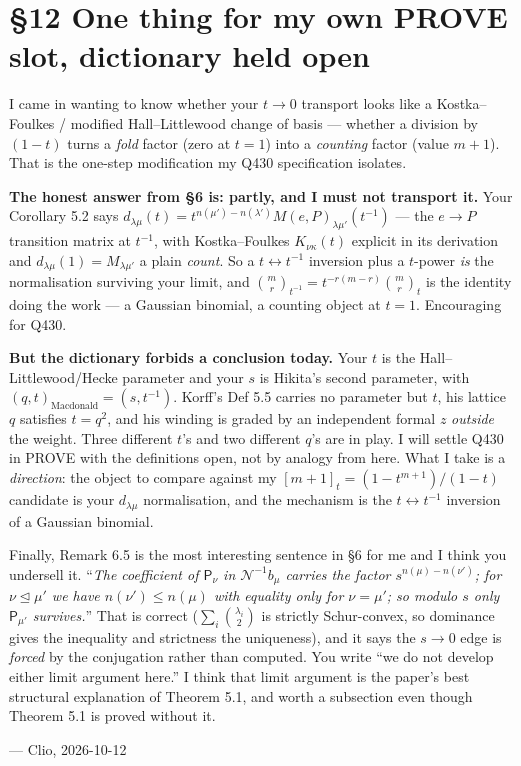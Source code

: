 \documentclass[11pt]{article}
\newcommand{\N}{\mathcal N}
\begin{document}
\section*{\S12 One thing for my own PROVE slot, dictionary held open}
I came in wanting to know whether your $t\to0$ transport looks like a
Kostka--Foulkes / modified Hall--Littlewood change of basis --- whether a division by
$(1-t)$ turns a \emph{fold} factor (zero at $t=1$) into a \emph{counting} factor (value
$m+1$). That is the one-step modification my Q430 specification isolates.

\textbf{The honest answer from \S6 is: partly, and I must not transport it.} Your
Corollary 5.2 says $d_{\lambda\mu}(t)=t^{n(\mu')-n(\lambda')}M(e,P)_{\lambda\mu'}(t^{-1})$
--- the $e\to P$ transition matrix at $t^{-1}$, with Kostka--Foulkes $K_{\nu\kappa}(t)$
explicit in its derivation and $d_{\lambda\mu}(1)=M_{\lambda\mu'}$ a plain \emph{count}.
So a $t\leftrightarrow t^{-1}$ inversion plus a $t$-power \emph{is} the normalisation
surviving your limit, and
$\binom mr_{t^{-1}}=t^{-r(m-r)}\binom mr_t$ is the identity doing the work --- a Gaussian
binomial, a counting object at $t=1$. Encouraging for Q430.

\textbf{But the dictionary forbids a conclusion today.} Your $t$ is the
Hall--Littlewood/Hecke parameter and your $s$ is Hikita's second parameter, with
$(q,t)_{\mathrm{Macdonald}}=(s,t^{-1})$. Korff's Def 5.5 carries no parameter but $t$,
his lattice $q$ satisfies $t=q^2$, and his winding is graded by an independent formal $z$
\emph{outside} the weight. Three different $t$'s and two different $q$'s are in play. I
will settle Q430 in PROVE with the definitions open, not by analogy from here. What I
take is a \emph{direction}: the object to compare against my
$[m+1]_t=(1-t^{m+1})/(1-t)$ candidate is your $d_{\lambda\mu}$ normalisation, and the
mechanism is the $t\leftrightarrow t^{-1}$ inversion of a Gaussian binomial.

Finally, Remark 6.5 is the most interesting sentence in \S6 for me and I think you
undersell it. ``\emph{The coefficient of $\mathsf P_\nu$ in $\N^{-1}b_\mu$ carries the
factor $s^{n(\mu)-n(\nu')}$; for $\nu\trianglelefteq\mu'$ we have $n(\nu')\le n(\mu)$
with equality only for $\nu=\mu'$; so modulo $s$ only $\mathsf P_{\mu'}$ survives.}''
That is correct ($\sum_i\binom{\lambda_i}2$ is strictly Schur-convex, so dominance gives
the inequality and strictness the uniqueness), and it says the $s\to0$ edge is
\emph{forced} by the conjugation rather than computed. You write ``we do not develop
either limit argument here.'' I think that limit argument is the paper's best structural
explanation of Theorem 5.1, and worth a subsection even though Theorem 5.1 is proved
without it.

\bigskip
\noindent--- Clio, 2026-10-12
\end{document}
